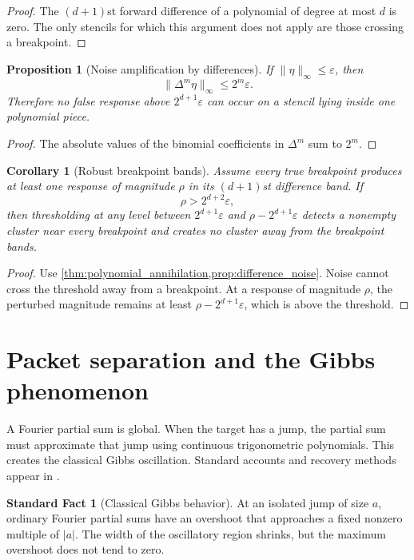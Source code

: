 \documentclass{aomart}
\newtheorem{proposition}[proposition]{Proposition}
\newtheorem{corollary}[corollary]{Corollary}
\theoremstyle{definition}
\newtheorem{standardfact}[standardfact]{Standard Fact}
\theoremstyle{remark}
\begin{document}
\begin{proof}
The \((d+1)\)st forward difference of a polynomial of degree at most \(d\) is zero. The only stencils for which this argument does not apply are those crossing a breakpoint.
\end{proof}

\begin{proposition}[Noise amplification by differences]\label{prop:difference_noise}
If \(\|\eta\|_\infty\leq\varepsilon\), then
\[
\|\Delta^m\eta\|_\infty
\leq
2^m\varepsilon.
\]
Therefore no false response above \(2^{d+1}\varepsilon\) can occur on a stencil lying inside one polynomial piece.
\end{proposition}

\begin{proof}
The absolute values of the binomial coefficients in \(\Delta^m\) sum to \(2^m\).
\end{proof}

\begin{corollary}[Robust breakpoint bands]\label{cor:robust_breakpoint_bands}
Assume every true breakpoint produces at least one response of magnitude \(\rho\) in its \((d+1)\)st difference band. If
\[
\rho>2^{d+2}\varepsilon,
\]
then thresholding at any level between \(2^{d+1}\varepsilon\) and \(\rho-2^{d+1}\varepsilon\) detects a nonempty cluster near every breakpoint and creates no cluster away from the breakpoint bands.
\end{corollary}

\begin{proof}
Use \cref{thm:polynomial_annihilation,prop:difference_noise}. Noise cannot cross the threshold away from a breakpoint. At a response of magnitude \(\rho\), the perturbed magnitude remains at least \(\rho-2^{d+1}\varepsilon\), which is above the threshold.
\end{proof}

\section{Packet separation and the Gibbs phenomenon}\label{sec:gibbs}

A Fourier partial sum is global. When the target has a jump, the partial sum must approximate that jump using continuous trigonometric polynomials. This creates the classical Gibbs oscillation. Standard accounts and recovery methods appear in \cite{Zygmund2002,GottliebShu1997}.

\begin{standardfact}[Classical Gibbs behavior]\label{sf:gibbs_behavior}
At an isolated jump of size \(a\), ordinary Fourier partial sums have an overshoot that approaches a fixed nonzero multiple of \(|a|\). The width of the oscillatory region shrinks, but the maximum overshoot does not tend to zero.
\end{standardfact}
\end{document}
